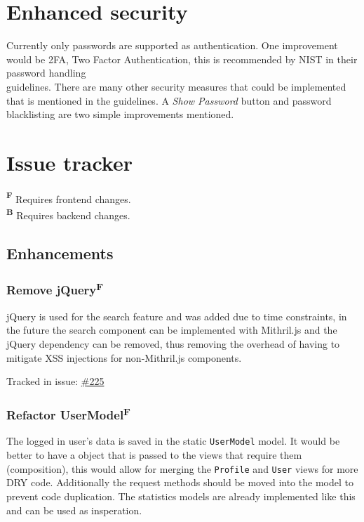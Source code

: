 \documentclass[12pt,a4paper]{report}
\begin{document}

\section{Enhanced security}
Currently only passwords are supported as authentication. One improvement would be 2FA, Two Factor Authentication, this is recommended by NIST in their password handling \\ guidelines\cite{nist-passwords}. There are many other security measures that could be implemented that is mentioned in the guidelines. A \textit{Show Password} button and password blacklisting are two simple improvements mentioned\cite{oauth-nist}.

\section{Issue tracker}
\label{sec:issue-tracker}
\textbf{\textsuperscript{F}} Requires frontend changes. \\
\textbf{\textsuperscript{B}} Requires backend changes.

\subsection*{Enhancements}
\subsubsection{Remove jQuery\texorpdfstring{\textsuperscript{F}}{}}
\label{subsec:remove-jquery}
jQuery is used for the search feature and was added due to time constraints, in the future the search component can be implemented with Mithril.js and the jQuery dependency can be removed, thus removing the overhead of having to mitigate XSS injections for non-Mithril.js components.

Tracked in issue: \href{https://github.com/LuleaUniversityOfTechnology/2018-project-roaster/issues/225}{\#225}

\subsubsection{Refactor UserModel\texorpdfstring{\textsuperscript{F}}{}}
The logged in user's data is saved in the static \texttt{UserModel} model. It would be better to have a object that is passed to the views that require them (composition), this would allow for merging the \texttt{Profile} and \texttt{User} views for more DRY code. Additionally the request methods should be moved into the model to prevent code duplication. The statistics models are already implemented like this and can be used as insperation.
\end{document}
